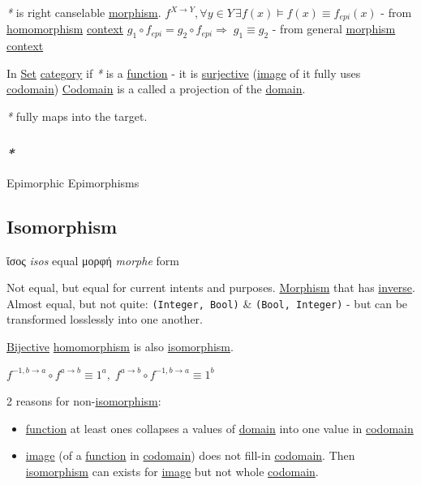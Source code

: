 \documentclass[a4paper,14pt,oneside]{book}
\begin{document}
\emph{*} is right canselable \hyperref[orgcfa41a6]{morphism}.
\(f^{X \to Y}, \forall y \in Y \, \exists f(x) \vDash f(x) \equiv f_{epi}(x)\) - from \hyperref[org829f1c4]{homomorphism} \hyperref[orgd7d1033]{context}
\(g_1 \circ f_{epi} = g_2 \circ f_{epi} \Rightarrow \; g_1 \equiv g_2\) - from general \hyperref[orgcfa41a6]{morphism} \hyperref[orgd7d1033]{context}

In \hyperref[org28abdc9]{Set} \hyperref[org82baa03]{category} if \emph{*} is a \hyperref[orgc39a15c]{function} - it is \hyperref[org180e9bb]{surjective} (\hyperref[orgd75a795]{image} of it fully uses \hyperref[orgc81ff1a]{codomain})
\hyperref[orgc81ff1a]{Codomain} is a called a projection of the \hyperref[orga435ae0]{domain}.

\emph{*} fully maps into the target.

\subsubsection{\emph{*}}
\label{sec:org3978b27}

\label{org52025f0}Epimorphic
\label{orgb1dadce}Epimorphisms

\subsection{\label{orga2e14b8}Isomorphism}
\label{sec:org3094fc3}
ἴσος \emph{isos} equal
μορφή \emph{morphe} form

Not equal, but equal for current intents and purposes.
\hyperref[orgcfa41a6]{Morphism} that has \hyperref[org5ad120e]{inverse}.
Almost equal, but not quite: \texttt{(Integer, Bool)} \& \texttt{(Bool, Integer)} - but can be transformed losslessly into one another.

\hyperref[orgf28abf7]{Bijective} \hyperref[org829f1c4]{homomorphism} is also \hyperref[orga2e14b8]{isomorphism}.

\(f^{-1, b \to a} \circ f^{a \to b} \equiv 1^a, \; f^{a \to b} \circ f^{-1, b \to a} \equiv 1^b\)

2 reasons for non-\hyperref[orga2e14b8]{isomorphism}:
\begin{itemize}
\item \hyperref[orgc39a15c]{function} at least ones collapses a values of \hyperref[orga435ae0]{domain} into one value in \hyperref[orgc81ff1a]{codomain}
\item \hyperref[orgd75a795]{image} (of a \hyperref[orgc39a15c]{function} in \hyperref[orgc81ff1a]{codomain}) does not fill-in \hyperref[orgc81ff1a]{codomain}. Then \hyperref[orga2e14b8]{isomorphism} can exists for \hyperref[orgd75a795]{image} but not whole \hyperref[orgc81ff1a]{codomain}.
\end{itemize}
\end{document}
